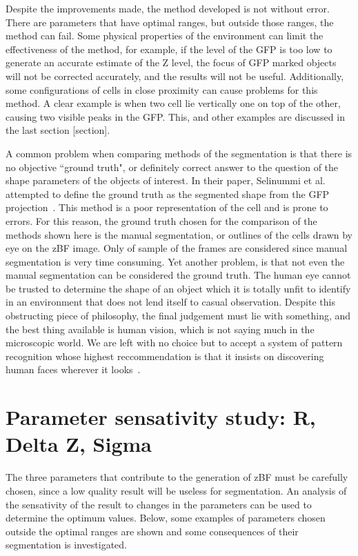 Despite the improvements made, the method developed is not without error. There are parameters that have optimal ranges, but outside those ranges, the method can fail. Some physical properties of the environment can limit the effectiveness of the method, for example, if the level of the GFP is too low to generate an accurate estimate of the Z level, the focus of GFP marked objects will not be corrected accurately, and the results will not be useful. Additionally, some configurations of cells in close proximity can cause problems for this method. A clear example is when two cell lie vertically one on top of the other, causing two visible peaks in the GFP. This, and other examples are discussed in the last section [section].

A common problem when comparing methods of the segmentation is that there is no objective ``ground truth", or definitely correct answer to the question of the shape parameters of the objects of interest. In their paper, Selinummi et al. attempted to define the ground truth as the segmented shape from the GFP projection~\cite{Selinummi:09}. This method is a poor representation of the cell and is prone to errors. For this reason, the ground truth chosen for the comparison of the methods shown here is the manual segmentation, or outlines of the cells drawn by eye on the zBF image. Only of sample of the frames are considered since manual segmentation is very time consuming. Yet another problem, is that not even the manual segmentation can be considered the ground truth. The human eye cannot be trusted to determine the shape of an object which it is totally unfit to identify in an environment that does not lend itself to casual observation. Despite this obstructing piece of philosophy, the final judgement must lie with something, and the best thing available is human vision, which is not saying much in the microscopic world. We are left with no choice but to accept a system of pattern recognition whose highest reccommendation is that it insists on discovering human faces wherever it looks~\cite{Fyfe:08}.

\section{Parameter sensativity study: R, Delta Z, Sigma}

The three parameters that contribute to the generation of zBF must be carefully chosen, since a low quality result will be useless for segmentation. An analysis of the sensativity of the result to changes in the parameters can be used to determine the optimum values. Below, some examples of parameters chosen outside the optimal ranges are shown and some consequences of their segmentation is investigated.

